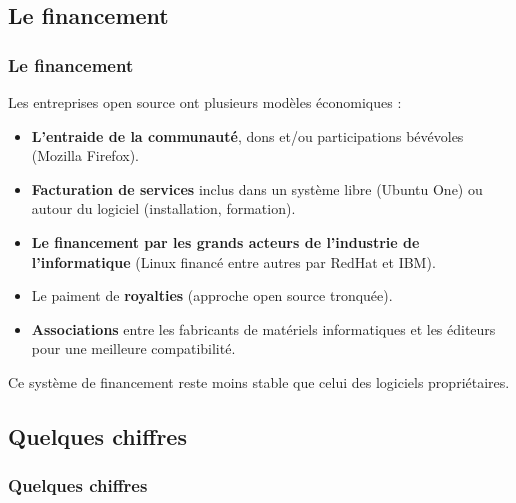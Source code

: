 \documentclass{beamer}
\begin{document}
\subsection[Le financement]{Le financement}

\begin{frame}
	\frametitle{Le financement}
	Les entreprises open source ont plusieurs modèles économiques :\newline
	\pause
	\begin{itemize}
		\item\footnotesize \textbf{L'entraide de la communauté}, dons et/ou participations bévévoles (Mozilla Firefox).
		\pause
		\item\footnotesize \textbf{Facturation de services} inclus dans un système libre (Ubuntu One) ou autour du logiciel (installation, formation).
		\pause
		\item\footnotesize \textbf{Le financement par les grands acteurs de l'industrie de l'informatique} (Linux financé entre autres par RedHat et IBM).
		\pause
		\item\footnotesize Le paiment de \textbf{royalties} (approche open source tronquée).
		\pause
		\item\footnotesize \textbf{Associations} entre les fabricants de matériels informatiques et les éditeurs pour une meilleure compatibilité.
		\newline
	\end{itemize}
	\pause
	Ce système de financement reste moins stable que celui des logiciels propriétaires.
\end{frame}

\subsection[Quelques chiffres]{Quelques chiffres}

\begin{frame}
	\frametitle{Quelques chiffres}
\end{frame}
\end{document}
